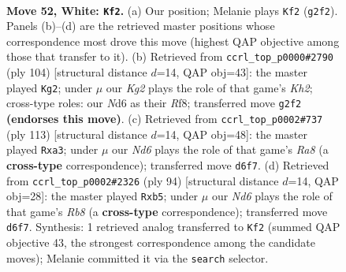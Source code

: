\documentclass[11pt]{article}
\begin{document}
\clearpage

\begin{figure}[p]\centering
\begin{subfigure}{0.46\textwidth}\centering
\resizebox{\linewidth}{!}{%
\newchessgame
\chessboard[
  setfen={1R6/6pk/3N1p2/5p1p/3P3P/4r1P1/6K1/8 w - - 2 52},
  showmover=false,
  pgfstyle=straightmove, color=movearrow, markmove={g2-f2}
]}
\caption{}
\end{subfigure}\hfill
\begin{subfigure}{0.46\textwidth}\centering
\resizebox{\linewidth}{!}{%
\newchessgame
\chessboard[
  setfen={5R2/6pk/5p2/4p3/4P1PP/5P2/7K/5r2 w - - 5 53},
  showmover=false,
  pgfstyle=straightmove, color=movearrow, markmove={h2-g2}
]}
\caption{}
\end{subfigure}
\\[4pt]
\begin{subfigure}{0.46\textwidth}\centering
\resizebox{\linewidth}{!}{%
\newchessgame
\chessboard[
  setfen={8/7k/3R3p/6pP/3p1p2/P4P2/6PK/r7 b - - 1 57},
  showmover=false,
  pgfstyle=straightmove, color=movearrow, markmove={a1-a3}
]}
\caption{}
\end{subfigure}\hfill
\begin{subfigure}{0.46\textwidth}\centering
\resizebox{\linewidth}{!}{%
\newchessgame
\chessboard[
  setfen={1R6/5pk1/6p1/1p5p/1P5P/r5P1/6K1/8 w - - 0 48},
  showmover=false,
  pgfstyle=straightmove, color=movearrow, markmove={b8-b5}
]}
\caption{}
\end{subfigure}
\caption{\textbf{Move 52, White: \texttt{Kf2}.} (a) Our position; Melanie plays \texttt{Kf2} (\texttt{g2f2}). Panels (b)--(d) are the retrieved master positions whose correspondence most drove this move (highest QAP objective among those that transfer to it). (b) Retrieved from \texttt{ccrl\_top\_p0000\#2790} (ply 104) [structural distance $d$=14, QAP obj=43]: the master played \texttt{Kg2}; under $\mu$ our \emph{Kg2} plays the role of that game's \emph{Kh2}; cross-type roles: our \emph{N}d6 as their \emph{R}f8; transferred move \texttt{g2f2} \textbf{(endorses this move)}. (c) Retrieved from \texttt{ccrl\_top\_p0002\#737} (ply 113) [structural distance $d$=14, QAP obj=48]: the master played \texttt{Rxa3}; under $\mu$ our \emph{Nd6} plays the role of that game's \emph{Ra8} (a \textbf{cross-type} correspondence); transferred move \texttt{d6f7}. (d) Retrieved from \texttt{ccrl\_top\_p0002\#2326} (ply 94) [structural distance $d$=14, QAP obj=28]: the master played \texttt{Rxb5}; under $\mu$ our \emph{Nd6} plays the role of that game's \emph{Rb8} (a \textbf{cross-type} correspondence); transferred move \texttt{d6f7}. Synthesis: 1 retrieved analog transferred to \texttt{Kf2} (summed QAP objective 43, the strongest correspondence among the candidate moves); Melanie committed it via the \texttt{search} selector.}
\label{fig:thought-m102}
\end{figure}
\end{document}

